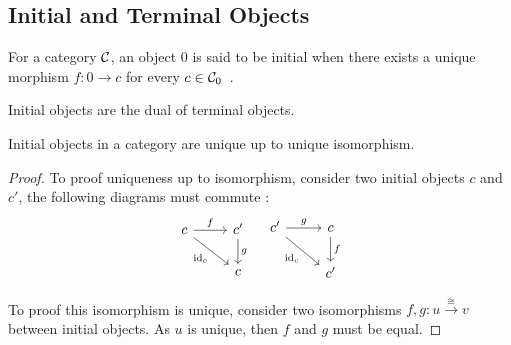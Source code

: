 \subsection{Initial and Terminal Objects}

\begin{definition}
  For a category $\mathcal{C}$, an object $0$ is said to be initial when there exists a
  unique morphism $f: 0\to c$ for every $c\in
  \mathcal{C}_0$~\parencite[p.~48]{leinster:basic_category_theory}.
\end{definition}

\begin{remark}
  Initial objects are the dual of terminal objects.
\end{remark}

\begin{theorem}
  Initial objects in a category are unique up to unique isomorphism.

  \begin{proof}
    To proof uniqueness up to isomorphism, consider two initial objects $c$ and $c'$, the following diagrams must
    commute :
    \[\begin{tikzcd}[ampersand replacement=\&]
      c \& {c'} \\
      \& c
      \arrow["{\id_c}"', from=1-1, to=2-2]
      \arrow["f", from=1-1, to=1-2]
      \arrow["g", from=1-2, to=2-2]
    \end{tikzcd}
    \quad
    \begin{tikzcd}[ampersand replacement=\&]
      {c'} \& c \\
      \& {c'}
      \arrow["{\id_c}"', from=1-1, to=2-2]
      \arrow["g", from=1-1, to=1-2]
      \arrow["f", from=1-2, to=2-2]
    \end{tikzcd}\]

    To proof this isomorphism is unique, consider two isomorphisms $f, g:
    u\overset{\cong}{\to}v$ between initial objects. As $u$ is unique, then $f$
    and $g$ must be equal.
  \end{proof}
\end{theorem}

